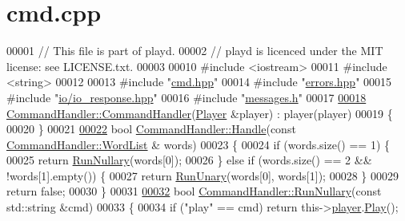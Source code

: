 \hypertarget{cmd_8cpp_source}{\section{cmd.\+cpp}
\label{cmd_8cpp_source}
}

\begin{DoxyCode}
00001 \textcolor{comment}{// This file is part of playd.}
00002 \textcolor{comment}{// playd is licenced under the MIT license: see LICENSE.txt.}
00003 
00010 \textcolor{preprocessor}{#include <iostream>}
00011 \textcolor{preprocessor}{#include <string>}
00012 
00013 \textcolor{preprocessor}{#include "\hyperlink{cmd_8hpp}{cmd.hpp}"}
00014 \textcolor{preprocessor}{#include "\hyperlink{errors_8hpp}{errors.hpp}"}
00015 \textcolor{preprocessor}{#include "\hyperlink{io__response_8hpp}{io/io\_response.hpp}"}
00016 \textcolor{preprocessor}{#include "\hyperlink{messages_8h}{messages.h}"}
00017 
\hypertarget{cmd_8cpp_source_l00018}{}\hyperlink{classCommandHandler_ae4d47b90e2cf2ab6d514576fedeb2192}{00018} \hyperlink{classCommandHandler_ae4d47b90e2cf2ab6d514576fedeb2192}{CommandHandler::CommandHandler}(\hyperlink{classPlayer}{Player} &player) : player(player)
00019 \{
00020 \}
00021 
\hypertarget{cmd_8cpp_source_l00022}{}\hyperlink{classCommandHandler_abc1ad0dfbff50db168d0a65cf05b169e}{00022} \textcolor{keywordtype}{bool} \hyperlink{classCommandHandler_abc1ad0dfbff50db168d0a65cf05b169e}{CommandHandler::Handle}(\textcolor{keyword}{const} \hyperlink{classCommandHandler_ae6cc650f171966041b385c8a4a766639}{CommandHandler::WordList} &
      words)
00023 \{
00024     \textcolor{keywordflow}{if} (words.size() == 1) \{
00025         \textcolor{keywordflow}{return} \hyperlink{classCommandHandler_a22ac65683643c6f6037441a8e5fd04d4}{RunNullary}(words[0]);
00026     \} \textcolor{keywordflow}{else} \textcolor{keywordflow}{if} (words.size() == 2 && !words[1].empty()) \{
00027         \textcolor{keywordflow}{return} \hyperlink{classCommandHandler_a75904aa3532bba1e548fbcff00544d46}{RunUnary}(words[0], words[1]);
00028     \}
00029     \textcolor{keywordflow}{return} \textcolor{keyword}{false};
00030 \}
00031 
\hypertarget{cmd_8cpp_source_l00032}{}\hyperlink{classCommandHandler_a22ac65683643c6f6037441a8e5fd04d4}{00032} \textcolor{keywordtype}{bool} \hyperlink{classCommandHandler_a22ac65683643c6f6037441a8e5fd04d4}{CommandHandler::RunNullary}(\textcolor{keyword}{const} std::string &cmd)
00033 \{
00034     \textcolor{keywordflow}{if} (\textcolor{stringliteral}{"play"} == cmd) \textcolor{keywordflow}{return} this->\hyperlink{classCommandHandler_a398ba97a0625f5fbc3ced6679cfd3766}{player}.\hyperlink{classPlayer_a1df3950102f682608482042cdea96598}{Play}();

\end{DoxyCode}
